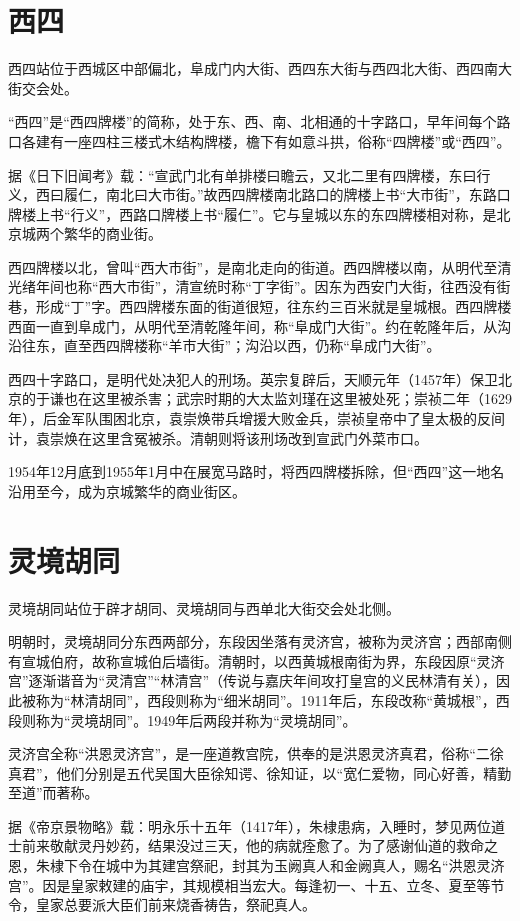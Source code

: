 \section{西四}
西四站位于西城区中部偏北，阜成门内大街、西四东大街与西四北大街、西四南大街交会处。

“西四”是“西四牌楼”的简称，处于东、西、南、北相通的十字路口，早年间每个路口各建有一座四柱三楼式木结构牌楼，檐下有如意斗拱，俗称“四牌楼”或“西四”。

据《日下旧闻考》载：“宣武门北有单排楼曰瞻云，又北二里有四牌楼，东曰行义，西曰履仁，南北曰大市街。”故西四牌楼南北路口的牌楼上书“大市街”，东路口牌楼上书“行义”，西路口牌楼上书“履仁”。它与皇城以东的东四牌楼相对称，是北京城两个繁华的商业街。

西四牌楼以北，曾叫“西大市街”，是南北走向的街道。西四牌楼以南，从明代至清光绪年间也称“西大市街”，清宣统时称“丁字街”。因东为西安门大街，往西没有街巷，形成“丁”字。西四牌楼东面的街道很短，往东约三百米就是皇城根。西四牌楼西面一直到阜成门，从明代至清乾隆年间，称“阜成门大街”。约在乾隆年后，从沟沿往东，直至西四牌楼称“羊市大街”；沟沿以西，仍称“阜成门大街”。

西四十字路口，是明代处决犯人的刑场。英宗复辟后，天顺元年（1457年）保卫北京的于谦也在这里被杀害；武宗时期的大太监刘瑾在这里被处死；崇祯二年（1629年），后金军队围困北京，袁崇焕带兵增援大败金兵，崇祯皇帝中了皇太极的反间计，袁崇焕在这里含冤被杀。清朝则将该刑场改到宣武门外菜市口。

1954年12月底到1955年1月中在展宽马路时，将西四牌楼拆除，但“西四”这一地名沿用至今，成为京城繁华的商业街区。

\section{灵境胡同}
灵境胡同站位于辟才胡同、灵境胡同与西单北大街交会处北侧。

明朝时，灵境胡同分东西两部分，东段因坐落有灵济宫，被称为灵济宫；西部南侧有宣城伯府，故称宣城伯后墙街。清朝时，以西黄城根南街为界，东段因原“灵济宫”逐渐谐音为“灵清宫”“林清宫”（传说与嘉庆年间攻打皇宫的义民林清有关），因此被称为“林清胡同”，西段则称为“细米胡同”。1911年后，东段改称“黄城根”，西段则称为“灵境胡同”。1949年后两段并称为“灵境胡同”。

灵济宫全称“洪恩灵济宫”，是一座道教宫院，供奉的是洪恩灵济真君，俗称“二徐真君”，他们分别是五代吴国大臣徐知谔、徐知证，以“宽仁爱物，同心好善，精勤至道”而著称。

据《帝京景物略》载：明永乐十五年（1417年），朱棣患病，入睡时，梦见两位道士前来敬献灵丹妙药，结果没过三天，他的病就痊愈了。为了感谢仙道的救命之恩，朱棣下令在城中为其建宫祭祀，封其为玉阙真人和金阙真人，赐名“洪恩灵济宫”。因是皇家敕建的庙宇，其规模相当宏大。每逢初一、十五、立冬、夏至等节令，皇家总要派大臣们前来烧香祷告，祭祀真人。

